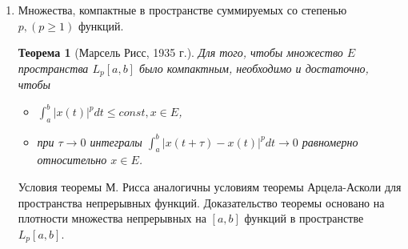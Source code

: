 \documentclass[12pt,a4paper,titlepage, oneside]{book}
\newcommand{\overbar}[1]{\mkern 1.5mu\overline{\mkern-1.5mu#1\mkern-1.5mu}\mkern 1.5mu}
\theoremstyle{definition}
\theoremstyle{plain}
\newtheorem*{theorem}{Теорема}
\theoremstyle{remark}
\theoremstyle{remark}
\theoremstyle{remark}
\theoremstyle{plain}
\theoremstyle{plain}
\begin{document}
\begin{enumerate}
\begin{proof}
	Множество $H_{\varepsilon}$ компактно в $C[a, b]$. Действительно, каждая ломаная определяется $n$ числами $(\eta_1, \eta_2,...,\eta_n )$, где все числа $\eta_k$ ограничены: $|\eta_k|\leq const$. Из любой последовательности ломаных из $H_{\varepsilon}$ можно образовать фундаментальную последовательность.
	
	Покажем, что компактное множество $H_{\varepsilon}$ образует в $E$ $\varepsilon$-сеть. Для любой функции $x\in E$ построим ломаную $\overbar{x}(t)$, $\overbar{x} \in H_{\varepsilon}$. Так как $x(t)$ непрерывна, то на отрезке $[t_k, t_{k+1}]$ она достигает своего максимального значения $M_k$ и своего минимального значения $m_k$: $m_k \leq x(t) \leq M_k, t \in [t_k, t_{k+1}]$. В этих же пределах лежат и значения линейной функции $\overbar{x}(t)$. Ясно, что $|x(t)-\overbar{x}(t)|\leq M_k-m_k, t \in [t_k, t_{k+1}]$.
	
	В силу выбора значения $\delta$ величины $M_k-m_k < \varepsilon$. Тогда и $\rho(x, \overbar{x} < \varepsilon$. Согласна следствию теоремы Хаусдорфа, множество $E$ компактно в $C[a, b]$.
	
	$\underbar {Необходимость}$ Свойства функций из компактного множества $E$, указанные в теореме, сразу следуют из существования в $E$ $\underbar {конечной}$ $\varepsilon$-сети непрерывных на $[a, b]$ функций $x_1(t), x_2(t),...,x_N(t)$.	

\end{proof}

	\item Множества, компактные в пространстве суммируемых со степенью $p, (p \geq 1)$ функций.

\begin{theorem} [Марсель Рисс, 1935 г.]
Для того, чтобы множество $E$  пространства $L_p[a, b]$ было компактным, необходимо и достаточно, чтобы

\begin{itemize}

	\item $\int_{a}^{b} |x(t)|^p dt \leq const, x \in E$,

	\item при $\tau \to 0$ интегралы $\int_{a}^{b} |x(t+\tau)-x(t)|^p dt \to 0$ равномерно относительно $x \in E$.

\end{itemize}

\end{theorem}

Условия теоремы М. Рисса аналогичны условиям теоремы Арцела-Асколи для пространства непрерывных функций. Доказательство теоремы основано на плотности множества непрерывных на $[a, b]$ функций в пространстве $L_p [a, b]$.


\end{enumerate}
\end{document}
